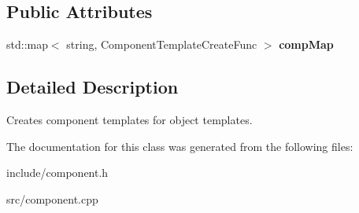 \subsection*{\-Public \-Attributes}
\begin{DoxyCompactItemize}
\item 
\hypertarget{classComponentTemplateManager_ae03e02a1eaabec86f9fefb883deaf42f}{
std\-::map$<$ string, \*
\-Component\-Template\-Create\-Func $>$ {\bfseries comp\-Map}}
\label{d8/d74/classComponentTemplateManager_ae03e02a1eaabec86f9fefb883deaf42f}

\end{DoxyCompactItemize}


\subsection{\-Detailed \-Description}
\-Creates component templates for object templates. 

\-The documentation for this class was generated from the following files\-:\begin{DoxyCompactItemize}
\item 
include/component.\-h\item 
src/component.\-cpp\end{DoxyCompactItemize}
